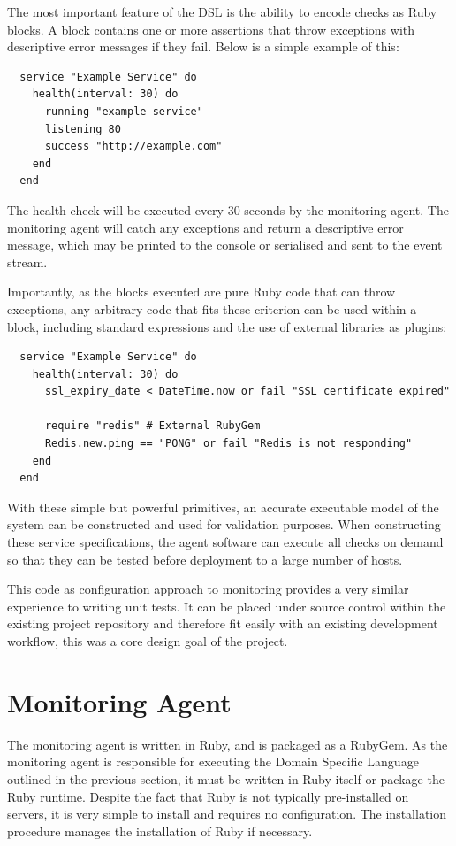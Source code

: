 \documentclass{cshonours}
\begin{document}
The most important feature of the DSL is the ability to encode checks as Ruby blocks. A block contains one or more assertions that throw exceptions with descriptive error messages if they fail. Below is a simple example of this:

\begin{verbatim}
  service "Example Service" do
    health(interval: 30) do
      running "example-service"
      listening 80
      success "http://example.com"
    end
  end
\end{verbatim}

The health check will be executed every 30 seconds by the monitoring agent. The monitoring agent will catch any exceptions and return a descriptive error message, which may be printed to the console or serialised and sent to the event stream.

Importantly, as the blocks executed are pure Ruby code that can throw exceptions, any arbitrary code that fits these criterion can be used within a block, including standard expressions and the use of external libraries as plugins:

\begin{verbatim}
  service "Example Service" do
    health(interval: 30) do
      ssl_expiry_date < DateTime.now or fail "SSL certificate expired"

      require "redis" # External RubyGem
      Redis.new.ping == "PONG" or fail "Redis is not responding"
    end
  end
\end{verbatim}

With these simple but powerful primitives, an accurate executable model of the system can be constructed and used for validation purposes. When constructing these service specifications, the agent software can execute all checks on demand so that they can be tested before deployment to a large number of hosts.

This code as configuration approach to monitoring provides a very similar experience to writing unit tests. It can be placed under source control within the existing project repository and therefore fit easily with an existing development workflow, this was a core design goal of the project.

\pagebreak
\section{Monitoring Agent}

The monitoring agent is written in Ruby, and is packaged as a RubyGem. As the monitoring agent is responsible for executing the Domain Specific Language outlined in the previous section, it must be written in Ruby itself or package the Ruby runtime. Despite the fact that Ruby is not typically pre-installed on servers, it is very simple to install and requires no configuration. The installation procedure manages the installation of Ruby if necessary.
\end{document}
